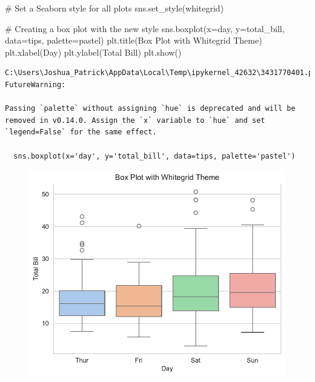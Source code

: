 \documentclass[
  letterpaper,
  DIV=11,
  numbers=noendperiod]{scrreprt}
\newenvironment{Shaded}{\begin{snugshade}}{\end{snugshade}}
\newcommand{\CommentTok}[1]{\textcolor[rgb]{0.37,0.37,0.37}{#1}}
\newcommand{\NormalTok}[1]{\textcolor[rgb]{0.00,0.23,0.31}{#1}}
\newcommand{\OperatorTok}[1]{\textcolor[rgb]{0.37,0.37,0.37}{#1}}
\newcommand{\StringTok}[1]{\textcolor[rgb]{0.13,0.47,0.30}{#1}}
\begin{document}
\begin{Shaded}
\begin{Highlighting}[]
\CommentTok{\# Set a Seaborn style for all plots}
\NormalTok{sns.set\_style(}\StringTok{\textquotesingle{}whitegrid\textquotesingle{}}\NormalTok{)}

\CommentTok{\# Creating a box plot with the new style}
\NormalTok{sns.boxplot(x}\OperatorTok{=}\StringTok{\textquotesingle{}day\textquotesingle{}}\NormalTok{, y}\OperatorTok{=}\StringTok{\textquotesingle{}total\_bill\textquotesingle{}}\NormalTok{, data}\OperatorTok{=}\NormalTok{tips, palette}\OperatorTok{=}\StringTok{\textquotesingle{}pastel\textquotesingle{}}\NormalTok{)}
\NormalTok{plt.title(}\StringTok{\textquotesingle{}Box Plot with Whitegrid Theme\textquotesingle{}}\NormalTok{)}
\NormalTok{plt.xlabel(}\StringTok{\textquotesingle{}Day\textquotesingle{}}\NormalTok{)}
\NormalTok{plt.ylabel(}\StringTok{\textquotesingle{}Total Bill\textquotesingle{}}\NormalTok{)}
\NormalTok{plt.show()}
\end{Highlighting}
\end{Shaded}

\begin{verbatim}
C:\Users\Joshua_Patrick\AppData\Local\Temp\ipykernel_42632\3431770401.py:5: FutureWarning: 

Passing `palette` without assigning `hue` is deprecated and will be removed in v0.14.0. Assign the `x` variable to `hue` and set `legend=False` for the same effect.

  sns.boxplot(x='day', y='total_bill', data=tips, palette='pastel')
\end{verbatim}

\begin{figure}[H]

{\centering \includegraphics{15_Data_Vis_files/figure-pdf/cell-17-output-2.pdf}

}

\end{figure}
\end{document}
